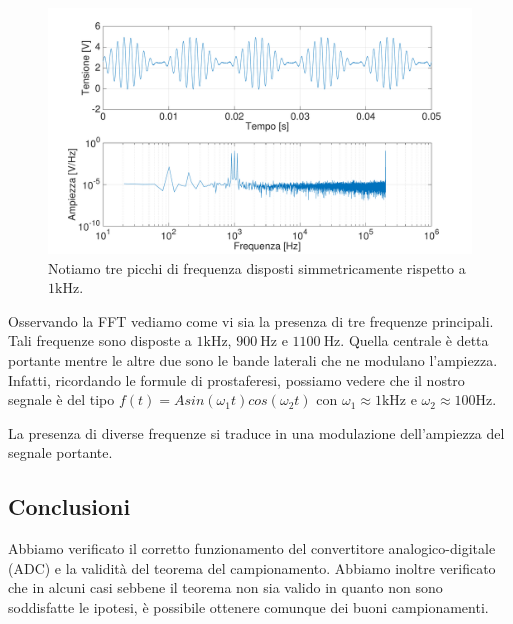 \begin{figure}[H]
\centering
	\includegraphics[width=.73\textwidth]{../E13/latex/am1000hz@10000,200000.pdf}
	\caption{Notiamo tre picchi di frequenza disposti simmetricamente rispetto a $1\si{\kilo\hertz}$.}
	\label{am}
\end{figure}

Osservando la FFT vediamo come vi sia la presenza di tre frequenze principali. Tali frequenze sono disposte a $1\si{\kilo\hertz}$, $\SI{900}{\hertz}$ e $\SI{1100}{\hertz}$. Quella centrale è detta portante mentre le altre due sono le bande laterali che ne modulano l'ampiezza.  Infatti, ricordando le formule di prostaferesi, possiamo vedere che il nostro segnale è del tipo $f(t)=Asin(\omega_1 t)cos(\omega_2 t)$ con $\omega_1 \approx 1 \si{\kilo\hertz}$ e $\omega_2 \approx 100 \si{\hertz}$. 

La presenza di diverse frequenze si traduce in una modulazione dell'ampiezza del segnale portante.



\subsection*{Conclusioni}

Abbiamo verificato il corretto funzionamento del convertitore analogico-digitale (ADC) e la validità del teorema del campionamento. Abbiamo inoltre verificato che in alcuni casi sebbene il teorema non sia valido in quanto non sono soddisfatte le ipotesi, è possibile ottenere comunque dei buoni campionamenti.
